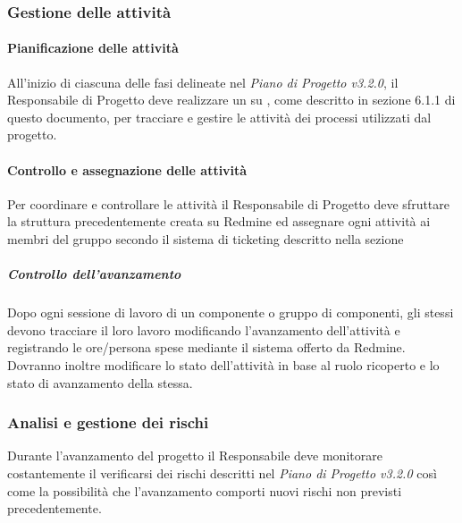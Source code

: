 \label{}

\subsubsection{Gestione delle attività}
\label{}

\paragraph{Pianificazione delle attività}
\label{}
All'inizio di ciascuna delle fasi delineate nel \emph{Piano di Progetto v3.2.0}, il Responsabile di Progetto deve realizzare un  su , come descritto in sezione 6.1.1 di questo documento, per tracciare e gestire le attività dei processi utilizzati dal progetto.


\paragraph{Controllo e assegnazione delle attività}
Per coordinare e controllare le attività il Responsabile di Progetto deve sfruttare la struttura precedentemente creata su Redmine ed assegnare ogni attività ai membri del gruppo secondo il sistema di ticketing descritto nella sezione


\subparagraph{Controllo dell'avanzamento}
\label{}
Dopo ogni sessione di lavoro di un componente o gruppo di componenti, gli stessi devono tracciare il loro lavoro modificando l'avanzamento dell'attività e registrando le ore/persona spese mediante il sistema offerto da Redmine.
Dovranno inoltre modificare lo stato dell'attività in base al ruolo ricoperto e lo stato di avanzamento della stessa. 
%

\subsubsection{Analisi e gestione dei rischi}
\label{}
Durante l'avanzamento del progetto il Responsabile  deve monitorare costantemente il verificarsi dei rischi descritti nel \emph{Piano di Progetto v3.2.0} così come la possibilità che l'avanzamento comporti nuovi rischi non previsti precedentemente.

